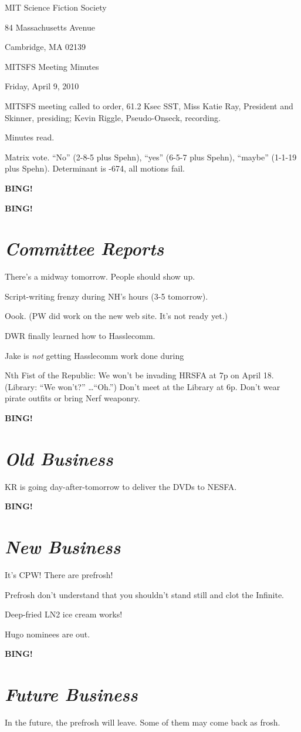 \documentclass[10pt]{article}
\newcommand{\bing}{{\bf BING!} }
\newcommand{\goto}[1]{\bing \vskip 12pt \section*{{\em{#1}}}}
\newcommand{\ps}{ plus Spehn\xspace}
\newcommand{\skinner}{Miss Katie Ray, President and Skinner}
\newcommand{\onseck}{Kevin Riggle, Pseudo-Onseck}
\newcommand{\meetingdate}{Friday, April 9, 2010}
\begin{document}
\begin{center}

MIT Science Fiction Society

84 Massachusetts Avenue

Cambridge, MA 02139

\vspace{12pt}

MITSFS Meeting Minutes

\meetingdate

\end{center}

\vspace{18pt}

\setlength{\parskip}{6pt}

\noindent
MITSFS meeting called to order, 61.2 Ksec SST,
\skinner, presiding; \onseck, recording.

Minutes read.

Matrix vote.  ``No'' (2-8-5\ps), ``yes'' (6-5-7\ps), ``maybe'' (1-1-19\ps).  Determinant is -674, all motions fail.

\bing

\goto{Committee Reports}

There's a midway tomorrow.  People should show up.

Script-writing frenzy during NH's hours (3-5 tomorrow).

Oook.  (PW did work on the new web site.  It's not ready yet.)

DWR finally learned how to Hasslecomm.

Jake is \emph{not} getting Hasslecomm work done during

Nth Fist of the Republic:  We won't be invading HRSFA at 7p on April 18.  (Library: ``We won't?'' \ldots ``Oh.'')  Don't meet at the Library at 6p.  Don't wear pirate outfits or bring Nerf weaponry.

\goto{Old Business}

KR is going day-after-tomorrow to deliver the DVDs to NESFA.

\goto{New Business}

It's CPW!  There are prefrosh!

Prefrosh don't understand that you shouldn't stand still and clot the Infinite.

Deep-fried LN2 ice cream works!

Hugo nominees are out.

\goto{Future Business}

In the future, the prefrosh will leave.  Some of them may come back as frosh.
\end{document}
